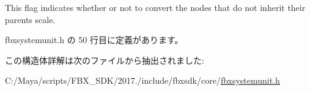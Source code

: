 This flag indicates whether or not to convert the nodes that do not inherit their parent\textquotesingle{}s scale. 



 fbxsystemunit.\+h の 50 行目に定義があります。



この構造体詳解は次のファイルから抽出されました\+:\begin{DoxyCompactItemize}
\item 
C\+:/\+Maya/scripts/\+F\+B\+X\+\_\+\+S\+D\+K/2017./include/fbxsdk/core/\hyperlink{fbxsystemunit_8h}{fbxsystemunit.\+h}\end{DoxyCompactItemize}
